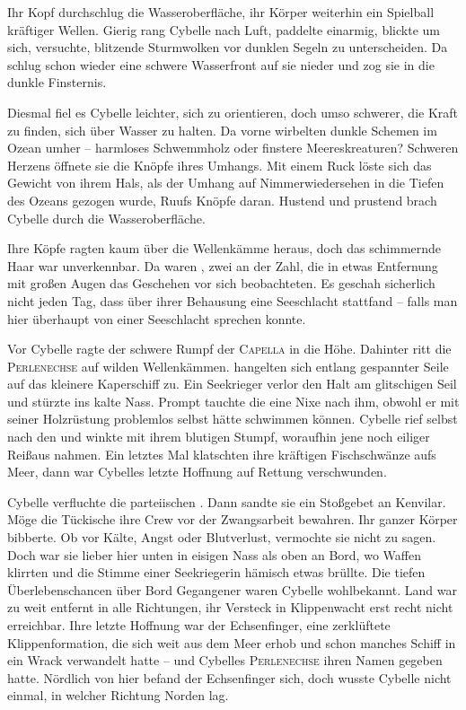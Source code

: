Ihr Kopf durchschlug die Wasseroberfläche, ihr Körper weiterhin ein Spielball kräftiger Wellen. Gierig rang Cybelle nach Luft, paddelte einarmig, blickte um sich, versuchte, blitzende Sturmwolken vor dunklen Segeln zu unterscheiden. Da schlug schon wieder eine schwere Wasserfront auf sie nieder und zog sie in die dunkle Finsternis.

Diesmal fiel es Cybelle leichter, sich zu orientieren, doch umso schwerer, die Kraft zu finden, sich über Wasser zu halten. Da vorne wirbelten dunkle Schemen im Ozean umher – harmloses Schwemmholz oder finstere Meereskreaturen? Schweren Herzens öffnete sie die Knöpfe ihres Umhangs. Mit einem Ruck löste sich das Gewicht von ihrem Hals, als der Umhang auf Nimmerwiedersehen in die Tiefen des Ozeans gezogen wurde, Ruufs Knöpfe daran. Hustend und prustend brach Cybelle durch die Wasseroberfläche. 

Ihre Köpfe ragten kaum über die Wellenkämme heraus, doch das schimmernde Haar war unverkennbar. Da waren , zwei an der Zahl, die in etwas Entfernung mit großen Augen das Geschehen vor sich beobachteten. Es geschah sicherlich nicht jeden Tag, dass über ihrer Behausung eine Seeschlacht stattfand – falls man hier überhaupt von einer Seeschlacht sprechen konnte. 

Vor Cybelle ragte der schwere Rumpf der \textsc{Capella} in die Höhe. Dahinter ritt die \textsc{Perlenechse} auf wilden Wellenkämmen.  hangelten sich entlang gespannter Seile auf das kleinere Kaperschiff zu. Ein Seekrieger verlor den Halt am glitschigen Seil und stürzte ins kalte Nass. Prompt tauchte die eine Nixe nach ihm, obwohl er mit seiner Holzrüstung problemlos selbst hätte schwimmen können. Cybelle rief selbst nach den  und winkte mit ihrem blutigen Stumpf, woraufhin jene noch eiliger Reißaus nahmen. Ein letztes Mal klatschten ihre kräftigen Fischschwänze aufs Meer, dann war Cybelles letzte Hoffnung auf Rettung verschwunden. 

Cybelle verfluchte die parteiischen . Dann sandte sie ein Stoßgebet an Kenvilar. Möge die Tückische ihre Crew vor der Zwangsarbeit bewahren. Ihr ganzer Körper bibberte. Ob vor Kälte, Angst oder Blutverlust, vermochte sie nicht zu sagen. Doch war sie lieber hier unten  in eisigen Nass als oben an Bord, wo Waffen klirrten und die Stimme einer Seekriegerin hämisch etwas brüllte. Die tiefen Überlebenschancen über Bord Gegangener waren Cybelle wohlbekannt. Land war zu weit entfernt in alle Richtungen, ihr Versteck in Klippenwacht erst recht nicht erreichbar. Ihre letzte Hoffnung war der Echsenfinger, eine zerklüftete Klippenformation, die sich weit aus dem Meer erhob und schon manches Schiff in ein Wrack verwandelt hatte – und Cybelles \textsc{Perlenechse} ihren Namen gegeben hatte. Nördlich von hier befand der Echsenfinger sich, doch wusste Cybelle nicht einmal, in welcher Richtung Norden lag.

